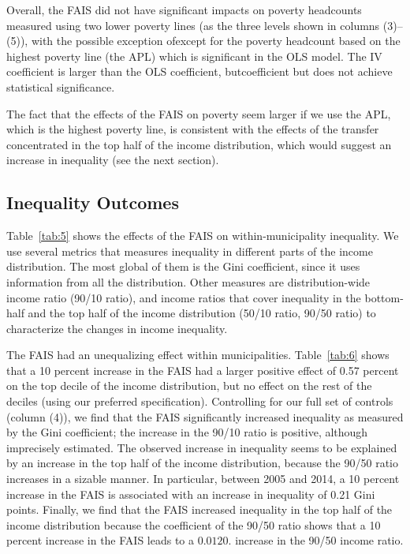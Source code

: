 \documentclass[dv_diss_main.tex]{subfiles}
\begin{document}
Overall, the FAIS did not have significant impacts on poverty headcounts measured using two lower poverty lines (as the three levels shown in columns (3)–(5)), with the possible exception ofexcept for the poverty headcount based on the highest poverty line (the APL) which is significant in the OLS model. The IV coefficient is larger than the OLS coefficient, butcoefficient but does not achieve statistical significance.

The fact that the effects of the FAIS on poverty seem larger if we use the APL, which is the highest poverty line, is consistent with the effects of the transfer concentrated in the top half of the income distribution, which would suggest an increase in inequality (see the next section).

\subsection{Inequality Outcomes}\label{subsec:inequiality}

Table~\ref{tab:5} shows the effects of the FAIS on within-municipality inequality. We use several metrics that measures inequality in different parts of the income distribution. The most global of them is the Gini coefficient, since it uses information from all the distribution. Other measures are distribution-wide income ratio (90/10 ratio), and income ratios that cover inequality in the bottom-half and the top half of the income distribution (50/10 ratio, 90/50 ratio) to characterize the changes in income inequality.

The FAIS had an unequalizing effect within municipalities. Table~\ref{tab:6} shows that a 10 percent increase in the FAIS had a larger positive effect of 0.57 percent on the top decile of the income distribution, but no effect on the rest of the deciles (using our preferred specification). Controlling for our full set of controls (column (4)), we find that the FAIS significantly increased inequality as measured by the Gini coefficient; the increase in the 90/10 ratio is positive, although imprecisely estimated. The observed increase in inequality seems to be explained by an increase in the top half of the income distribution, because the 90/50 ratio increases in a sizable manner. In particular, between 2005 and 2014, a 10 percent increase in the FAIS is associated with an increase in inequality of 0.21 Gini points. Finally, we find that the FAIS increased inequality in the top half of the income distribution because the coefficient of the 90/50 ratio shows that a 10 percent increase in the FAIS leads to a $0.012$0. increase in the 90/50 income ratio.
\end{document}
